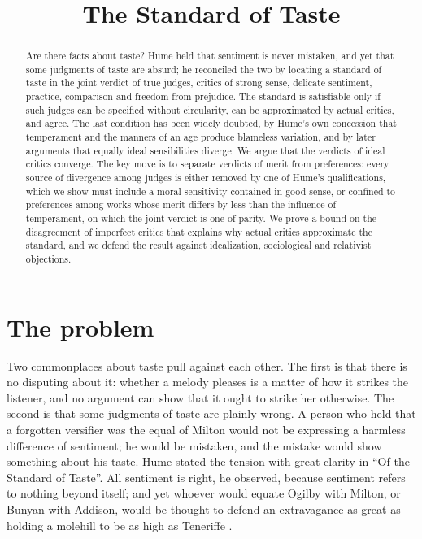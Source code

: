 \documentclass{situationist-preprint}
\title{The Standard of Taste}
\begin{document}
\maketitle

\begin{abstract}
Are there facts about taste? Hume held that sentiment is never mistaken, and yet that some judgments of taste are absurd; he reconciled the two by locating a standard of taste in the joint verdict of true judges, critics of strong sense, delicate sentiment, practice, comparison and freedom from prejudice. The standard is satisfiable only if such judges can be specified without circularity, can be approximated by actual critics, and agree. The last condition has been widely doubted, by Hume's own concession that temperament and the manners of an age produce blameless variation, and by later arguments that equally ideal sensibilities diverge. We argue that the verdicts of ideal critics converge. The key move is to separate verdicts of merit from preferences: every source of divergence among judges is either removed by one of Hume's qualifications, which we show must include a moral sensitivity contained in good sense, or confined to preferences among works whose merit differs by less than the influence of temperament, on which the joint verdict is one of parity. We prove a bound on the disagreement of imperfect critics that explains why actual critics approximate the standard, and we defend the result against idealization, sociological and relativist objections.
\end{abstract}

\section{The problem}

Two commonplaces about taste pull against each other. The first is that there is no disputing about it: whether a melody pleases is a matter of how it strikes the listener, and no argument can show that it ought to strike her otherwise. The second is that some judgments of taste are plainly wrong. A person who held that a forgotten versifier was the equal of Milton would not be expressing a harmless difference of sentiment; he would be mistaken, and the mistake would show something about his taste. Hume stated the tension with great clarity in \enquote{Of the Standard of Taste}. All sentiment is right, he observed, because sentiment refers to nothing beyond itself; and yet whoever would equate Ogilby with Milton, or Bunyan with Addison, would be thought to defend an extravagance as great as holding a molehill to be as high as Teneriffe \citep{Hume1757}.
\end{document}
